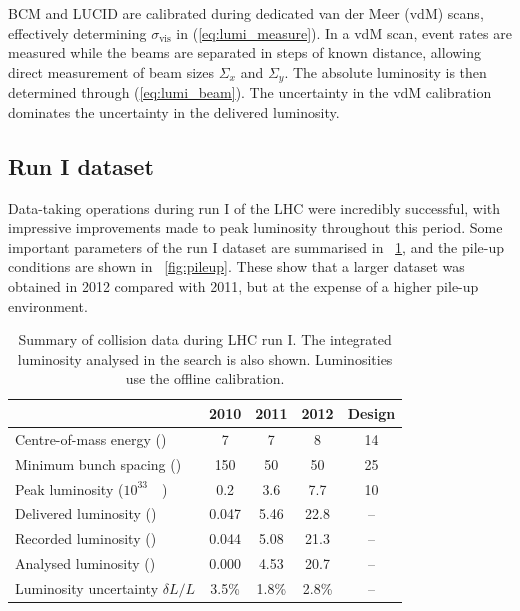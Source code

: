\ac{BCM} and LUCID are calibrated during dedicated van der Meer (vdM) scans, effectively 
determining $\sigma_{\text{vis}}$ in (\ref{eq:lumi_measure}). In a vdM scan, event rates 
are measured while the beams are separated in steps of known distance, allowing direct 
measurement of beam sizes $\varSigma_x$ and $\varSigma_y$. The absolute luminosity is then 
determined through (\ref{eq:lumi_beam}). The uncertainty in the vdM calibration dominates 
the uncertainty in the delivered luminosity.



\subsection{Run I dataset}
\label{sec:dataset:dataset}

Data-taking operations during run I of the LHC were incredibly successful, with impressive 
improvements made to peak luminosity throughout this period. Some important parameters of 
the run I dataset are summarised in \Table~\ref{tab:dataset}, and the pile-up conditions are shown in \Figure~\ref{fig:pileup}. These show that a larger dataset was obtained in 2012 compared with 2011, but at the expense of a higher pile-up environment.

\begin{table}[h]
	\begin{tabular}{l@{\hskip 0.3in}c@{\hskip 0.3in}c@{\hskip 0.3in}c@{\hskip 0.3in}c}
	& 2010 & 2011 & 2012 & Design \\
	\hline
	Centre-of-mass energy (\TeV)         & 7 & 7 & 8 & 14 \\
	Minimum bunch spacing (\nano\second) & 150 & 50 & 50 & 25 \\
	Peak luminosity (\unit{$10^{33}$}{\lumiunits}) & 0.2 & 3.6 & 7.7 & 10 \\
	Delivered luminosity (\invfb)       & 0.047 & 5.46 & 22.8 & -- \\
	Recorded luminosity (\invfb)        & 0.044 & 5.08 & 21.3 & -- \\
	Analysed luminosity (\invfb)        & 0.000 & 4.53 & 20.7 & -- \\
	Luminosity uncertainty $\delta L/L$ & 3.5\% & 1.8\% & 2.8\% & -- \\
	\end{tabular}
	\caption{Summary of \pp collision data during \ac{LHC} run I. The integrated 
	luminosity analysed in the \HWW search is also shown. Luminosities use the offline 
	calibration.}
	\label{tab:dataset}
\end{table}

